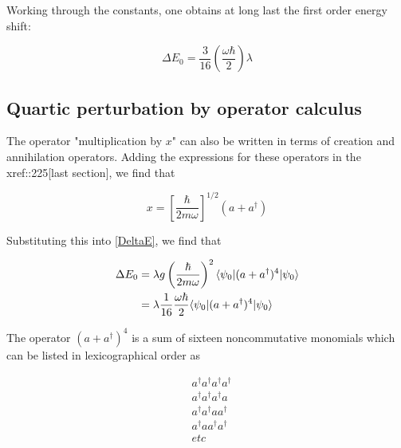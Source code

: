 Working through the constants, one obtains at long last the
first order energy shift:

\begin{equation}
\label{anharmonic_correction}
\Delta E_0 = \frac{3}{16}\left( \frac{\omega \hbar}{2}\right)  \lambda
\end{equation}


\subsection{Quartic perturbation by operator calculus}

The operator "multiplication by $x$" can also be written in terms of creation and annihilation operators.  Adding the expressions for these operators in the xref::225[last section], we find that

\begin{equation}
x = \left[\frac{ \hbar }{  2m \omega} \right]^{1/2} (a + a^\dagger )
\end{equation}

Substituting this into \eqref{DeltaE}, we find that

\begin{align}
\label{aa4}
\Delta E_0 &= \lambda g \left(\frac{ \hbar }{  2m \omega} \right)^{2} \langle \psi_0 | ( a + a^\dagger )^4 | \psi_0 \rangle \\
&= \lambda \frac{1}{16}\frac{\omega \hbar}{2}\langle \psi_0 | ( a + a^\dagger )^4 | \psi_0 \rangle
\end{align}

The operator $(a + a^\dagger)^4$ is a sum of sixteen noncommutative monomials which can be listed in lexicographical order as

\begin{align}
& a^\dagger a^\dagger a^\dagger a^\dagger \\
& a^\dagger a^\dagger a^\dagger a \\
& a^\dagger a^\dagger a  a^\dagger \\
& a^\dagger  a  a^\dagger a^\dagger \\
& etc
\end{align}

